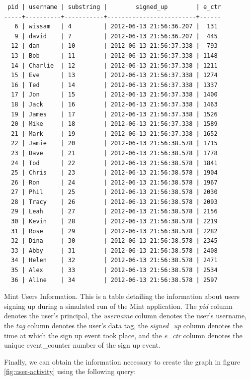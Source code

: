 \begin{table}
\begin{verbatim}
 pid | username | substring |        signed_up        | e_ctr 
-----+----------+-----------+-------------------------+------
   6 | wissam   | 4         | 2012-06-13 21:56:36.207 |  131
   9 | david    | 7         | 2012-06-13 21:56:36.207 |  445
  12 | dan      | 10        | 2012-06-13 21:56:37.338 |  793
  13 | Bob      | 11        | 2012-06-13 21:56:37.338 | 1148
  14 | Charlie  | 12        | 2012-06-13 21:56:37.338 | 1211
  15 | Eve      | 13        | 2012-06-13 21:56:37.338 | 1274
  16 | Ted      | 14        | 2012-06-13 21:56:37.338 | 1337
  17 | Jon      | 15        | 2012-06-13 21:56:37.338 | 1400
  18 | Jack     | 16        | 2012-06-13 21:56:37.338 | 1463
  19 | James    | 17        | 2012-06-13 21:56:37.338 | 1526
  20 | Mike     | 18        | 2012-06-13 21:56:37.338 | 1589
  21 | Mark     | 19        | 2012-06-13 21:56:37.338 | 1652
  22 | Jamie    | 20        | 2012-06-13 21:56:38.578 | 1715
  23 | Dave     | 21        | 2012-06-13 21:56:38.578 | 1778
  24 | Tod      | 22        | 2012-06-13 21:56:38.578 | 1841
  25 | Chris    | 23        | 2012-06-13 21:56:38.578 | 1904
  26 | Ron      | 24        | 2012-06-13 21:56:38.578 | 1967
  27 | Phil     | 25        | 2012-06-13 21:56:38.578 | 2030
  28 | Tracy    | 26        | 2012-06-13 21:56:38.578 | 2093
  29 | Leah     | 27        | 2012-06-13 21:56:38.578 | 2156
  30 | Kevin    | 28        | 2012-06-13 21:56:38.578 | 2219
  31 | Rose     | 29        | 2012-06-13 21:56:38.578 | 2282
  32 | Dina     | 30        | 2012-06-13 21:56:38.578 | 2345
  33 | Abby     | 31        | 2012-06-13 21:56:38.578 | 2408
  34 | Helen    | 32        | 2012-06-13 21:56:38.578 | 2471
  35 | Alex     | 33        | 2012-06-13 21:56:38.578 | 2534
  36 | Aline    | 34        | 2012-06-13 21:56:38.578 | 2597
\end{verbatim}
\caption[Mint Users Information]{Mint Users Information. This is a table detailing the information about users signing up during a simulated run of the Mint application. The \emph{pid} column denotes the user's principal, the \emph{username} column denotes the user's username, the \emph{tag} column denotes the user's data tag, the \emph{signed\_up} column denotes the time at which the sign up event took place, and the \emph{e\_ctr} column denotes the unique event\_counter number of the sign up event.}
\label{table:users-info}
\end{table}

Finally, we can obtain the information necessary to create the graph in figure \ref{fig:user-activity} using the following query:

